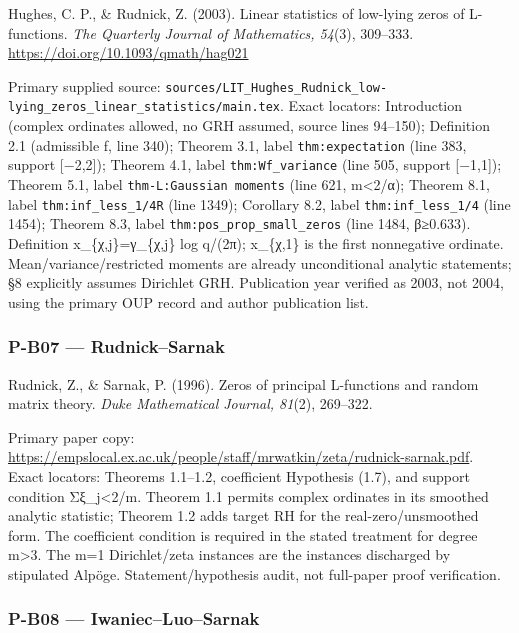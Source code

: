 \documentclass[11pt,a4paper]{article}
\theoremstyle{definition}\newtheorem{definition}{Definition}
\begin{document}
Hughes, C. P., \& Rudnick, Z. (2003). Linear statistics of low-lying
zeros of L-functions. \emph{The Quarterly Journal of Mathematics,
54}(3), 309--333. \url{https://doi.org/10.1093/qmath/hag021}

Primary supplied source:
\nolinkurl{sources/LIT_Hughes_Rudnick_low-lying_zeros_linear_statistics/main.tex}.
Exact locators: Introduction (complex ordinates allowed, no GRH assumed,
source lines 94--150); Definition 2.1 (admissible f, line 340); Theorem
3.1, label \nolinkurl{thm:expectation} (line 383, support {[}−2,2{]});
Theorem 4.1, label \nolinkurl{thm:Wf_variance} (line 505, support
{[}−1,1{]}); Theorem 5.1, label \texttt{thm-L:Gaussian\ moments} (line
621, m\textless2/α); Theorem 8.1, label \nolinkurl{thm:inf_less_1/4R}
(line 1349); Corollary 8.2, label \nolinkurl{thm:inf_less_1/4} (line
1454); Theorem 8.3, label \nolinkurl{thm:pos_prop_small_zeros} (line
1484, β≥0.633). Definition x\_\{χ,j\}=γ\_\{χ,j\} log q/(2π); x\_\{χ,1\}
is the first nonnegative ordinate. Mean/variance/restricted moments are
already unconditional analytic statements; §8 explicitly assumes
Dirichlet GRH. Publication year verified as 2003, not 2004, using the
primary OUP record and author publication list.

\subsubsection{P-B07 --- Rudnick--Sarnak}\label{p-b07--rudnicksarnak}

Rudnick, Z., \& Sarnak, P. (1996). Zeros of principal L-functions and
random matrix theory. \emph{Duke Mathematical Journal, 81}(2), 269--322.

Primary paper copy:
\url{https://empslocal.ex.ac.uk/people/staff/mrwatkin/zeta/rudnick-sarnak.pdf}.
Exact locators: Theorems 1.1--1.2, coefficient Hypothesis (1.7), and
support condition Σ\textbar ξ\_j\textbar\textless2/m. Theorem 1.1
permits complex ordinates in its smoothed analytic statistic; Theorem
1.2 adds target RH for the real-zero/unsmoothed form. The coefficient
condition is required in the stated treatment for degree m\textgreater3.
The m=1 Dirichlet/zeta instances are the instances discharged by
stipulated Alpöge. Statement/hypothesis audit, not full-paper proof
verification.

\subsubsection{P-B08 ---
Iwaniec--Luo--Sarnak}\label{p-b08--iwaniecluosarnak}
\end{document}
